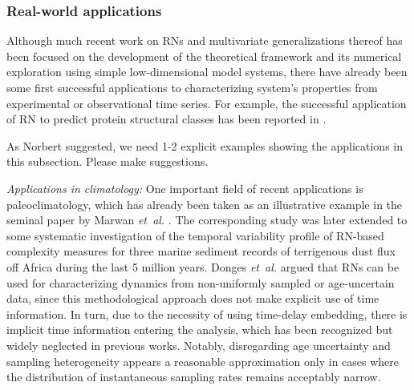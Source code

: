 		

		\subsubsection{Real-world applications}
		Although much recent work on RNs and multivariate generalizations thereof has been focused on the development of the theoretical framework and its numerical exploration using simple low-dimensional model systems, there have already been some first successful applications to characterizing system's properties from experimental or observational time series. For example, the successful application of RN to predict protein structural classes has been reported in \cite{Olyaee2016}. 
		
		{\color{red} As Norbert suggested, we need 1-2 explicit examples showing the applications in this subsection. Please make suggestions. }
		
		\emph{Applications in climatology: }
		One important field of recent applications is paleoclimatology, which has already been taken as an illustrative example in the seminal paper by Marwan \textit{et~al.} \cite{Marwan2009}. The corresponding study was later extended to some systematic investigation of the temporal variability profile of RN-based complexity measures for three marine sediment records of terrigenous dust flux off Africa during the last 5 million years. Donges \textit{et~al.} \cite{Donges2011} argued that RNs can be used for characterizing dynamics from non-uniformly sampled or age-uncertain data, since this methodological approach does not make explicit use of time information. In turn, due to the necessity of using time-delay embedding, there is implicit time information entering the analysis, which has been recognized but widely neglected in previous works. Notably, disregarding age uncertainty and sampling heterogeneity appears a reasonable approximation only in cases where the distribution of instantaneous sampling rates remains acceptably narrow. 

